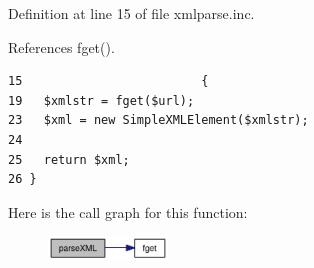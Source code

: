 Definition at line 15 of file xmlparse.inc.

References fget().

\begin{Code}\begin{verbatim}15                         {
19   $xmlstr = fget($url);
23   $xml = new SimpleXMLElement($xmlstr);
24 
25   return $xml;
26 }\end{verbatim}
\end{Code}




Here is the call graph for this function:\nopagebreak
\begin{figure}[H]
\begin{center}
\leavevmode
\includegraphics[width=90pt]{xmlparse_8inc_2ee17c038e8fe8a1ddc86bb533863cb7_cgraph}
\end{center}
\end{figure}
